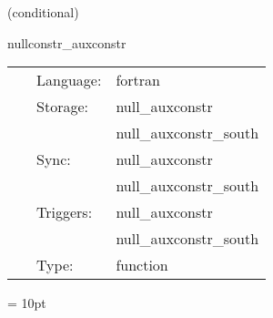 \vspace{5mm}

   (conditional) 

\hspace{5mm} nullconstr\_auxconstr 

\hspace{5mm}{\it calculate constraints associated with auxiliary variables } 


\hspace{5mm}

 \begin{tabular*}{160mm}{cll} 
~ & Language:  & fortran \\ 
~ & Storage:  & null\_auxconstr \\ 
~& ~ &null\_auxconstr\_south\\ 
~ & Sync:  & null\_auxconstr \\ 
~& ~ &null\_auxconstr\_south\\ 
~ & Triggers:  & null\_auxconstr \\ 
~& ~ &null\_auxconstr\_south\\ 
~ & Type:  & function \\ 
\end{tabular*} 



\vspace{5mm}\parskip = 10pt 
